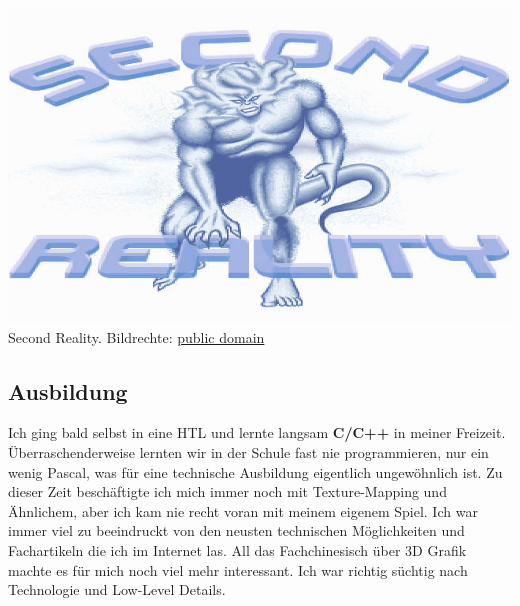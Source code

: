 \begin{center}
\includegraphics[width=0.9\linewidth]{austrianguy/austrianguy-secondreality.jpg}\\
\footnotesize{Second Reality. Bildrechte: \href{https://en.wikipedia.org/wiki/en:public_domain}{public domain}}
\end{center}

\subsection*{Ausbildung}

Ich ging bald selbst in eine HTL und lernte langsam \textbf{C/C++} in meiner Freizeit. Überraschenderweise lernten wir in der Schule fast nie programmieren, nur ein wenig Pascal, was für eine technische Ausbildung eigentlich ungewöhnlich ist. Zu dieser Zeit beschäftigte ich mich immer noch mit Texture-Mapping und Ähnlichem, aber ich kam nie recht voran mit meinem eigenem Spiel. Ich war immer viel zu beeindruckt von den neusten technischen Möglichkeiten und Fachartikeln die ich im Internet las. All das Fachchinesisch über 3D Grafik machte es für mich noch viel mehr interessant. Ich war richtig süchtig nach Technologie und Low-Level Details.


